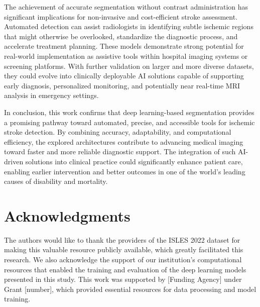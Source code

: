 \documentclass[12pt]{article}
\begin{document}
%
The achievement of accurate segmentation without contrast administration has significant implications for non-invasive and cost-efficient stroke assessment. Automated detection can assist radiologists in identifying subtle ischemic regions that might otherwise be overlooked, standardize the diagnostic process, and accelerate treatment planning. These models demonstrate strong potential for real-world implementation as assistive tools within hospital imaging systems or screening platforms. With further validation on larger and more diverse datasets, they could evolve into clinically deployable AI solutions capable of supporting early diagnosis, personalized monitoring, and potentially near real-time MRI analysis in emergency settings.

In conclusion, this work confirms that deep learning-based segmentation provides a promising pathway toward automated, precise, and accessible tools for ischemic stroke detection. By combining accuracy, adaptability, and computational efficiency, the explored architectures contribute to advancing medical imaging toward faster and more reliable diagnostic support. The integration of such AI-driven solutions into clinical practice could significantly enhance patient care, enabling earlier intervention and better outcomes in one of the world’s leading causes of disability and mortality.
\section*{Acknowledgments}
The authors would like to thank the providers of the ISLES 2022 dataset for making this valuable resource publicly available, which greatly facilitated this research. We also acknowledge the support of our institution's computational resources that enabled the training and evaluation of the deep learning models presented in this study.
This work was supported by [Funding Agency] under Grant [number], which provided essential resources for data processing and model training. 



\printbibliography[heading=bibintoc,title={References}]
\end{document}
